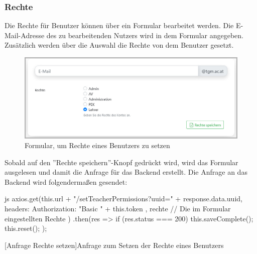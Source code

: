 \subsubsection{Rechte}
Die Rechte für Benutzer können über ein Formular bearbeitet werden. Die E-Mail-Adresse des zu bearbeitenden Nutzers wird in dem Formular angegeben. Zusätzlich werden über die Auswahl die Rechte von dem Benutzer gesetzt.
\begin{figure}[H]
	\centering
	\includegraphics[width=1\linewidth]{images/rfoster_implementierung/rights}
	\caption[Formular der Rechte]{Formular, um Rechte eines Benutzers zu setzen}
	\label{fig:rightsform}
\end{figure}
Sobald auf den ''Rechte speichern''-Knopf gedrückt wird, wird das Formular ausgelesen und damit die Anfrage für das Backend erstellt. Die Anfrage an das Backend wird folgendermaßen gesendet:
\begin{code}{js}
	axios.get(this.url + "/setTeacherPermissions?uuid=" + response.data.uuid,
	{
		headers: {
			Authorization: "Basic " + this.token
		}
	}, rechte	// Die im Formular eingestellten Rechte
	)
	.then(res => {
		if (res.status === 200) {
			this.saveComplete();
			this.reset();
		}
	});
\end{code}
[Anfrage Rechte setzen]{Anfrage zum Setzen der Rechte eines Benutzers}~\\